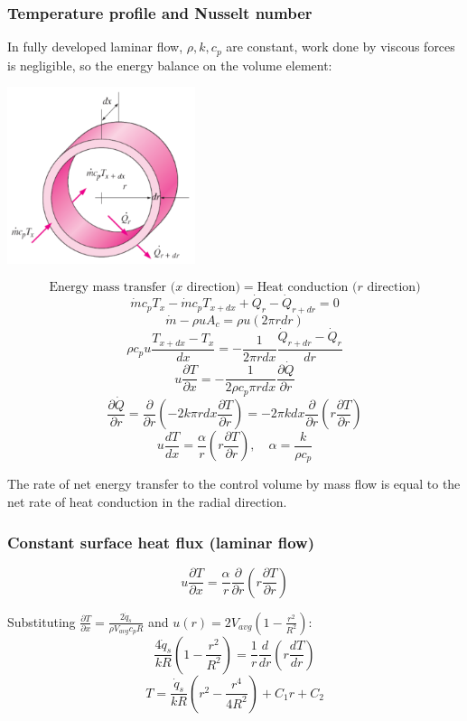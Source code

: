 \documentclass[11pt]{article}
\begin{document}
\subsubsection{Temperature profile and Nusselt number}
\label{sec:org696028b}
In fully developed laminar flow, \(\rho, k, c_p\) are constant, work done by viscous forces is negligible, so the energy balance on the volume element:
\begin{center}
\includegraphics[height=14em]{./images/temperature-profile-and-nusselt-number-diagram.png}
\end{center}
\[\text{Energy mass transfer ($x$ direction)} = \text{Heat conduction ($r$ direction)}\]
\[\dot{m} c_p T_x - \dot{m} c_p T_{x + dx} + \dot{Q}_r - \dot{Q}_{r + dr} = 0\]
\[\dot{m} - \rho u A_c = \rho u (2 \pi r dr)\]
\[\rho c_p u \frac{T_{x + dx} - T_x}{dx} = - \frac{1}{2 \pi r dx} \frac{\dot{Q}_{r + dr} - \dot{Q}_r}{dr}\]
\[u \frac{\partial T}{\partial x} = - \frac{1}{2 \rho c_p \pi r dx} \frac{\partial \dot{Q}}{\partial r}\]
\[\frac{\partial \dot{Q}}{\partial r} = \frac{\partial}{\partial r} \left(-2k \pi r dx \frac{\partial T}{\partial r} \right) = - 2 \pi k dx \frac{\partial}{\partial r} \left(r \frac{\partial T}{\partial r} \right)\]
\[u \frac{dT}{dx} = \frac{\alpha}{r} \left(r \frac{\partial T}{\partial r} \right), \quad \alpha = \frac{k}{\rho c_p}\]

The rate of net energy transfer to the control volume by mass flow is equal to the net rate of heat conduction in the radial direction.

\subsubsection{Constant surface heat flux (laminar flow)}
\label{sec:orge2debf9}
\[u \frac{\partial T}{\partial x} = \frac{\alpha}{r} \frac{\partial}{\partial r} \left(r \frac{\partial T}{\partial r} \right)\]

Substituting \(\frac{\partial T}{\partial x} = \frac{2 \dot{q}_s}{\rho V_{avg} c_p R}\) and \(u(r) = 2 V_{avg} \left(1 - \frac{r^2}{R^2} \right)\):
\[\frac{4 \dot{q}_s}{kR} \left(1 - \frac{r^2}{R^2} \right) = \frac{1}{r} \frac{d}{dr} \left(r \frac{dT}{dr} \right)\]
\[T = \frac{\dot{q}_s}{kR} \left(r^2 - \frac{r^4}{4R^2} \right) + C_1 r + C_2\]
\end{document}
